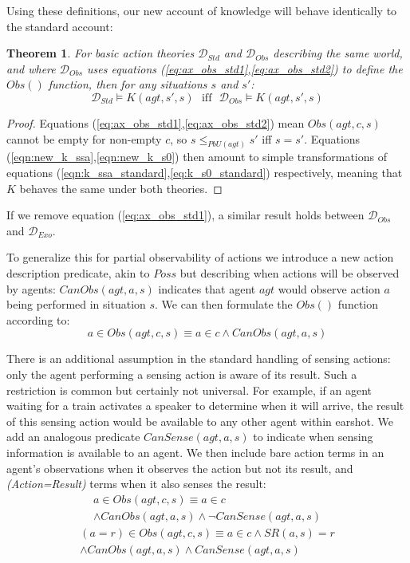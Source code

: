 \documentclass{ifaamas-submission}
\newtheorem{theorem}{Theorem}
\begin{document}
Using these definitions, our new account of knowledge will behave
identically to the standard account:

\begin{theorem}%
For basic action theories $\mathcal{D}_{Std}$ and $\mathcal{D}_{Obs}$
describing the same world, and where $\mathcal{D}_{Obs}$ uses equations
(\ref{eq:ax_obs_std1},\ref{eq:ax_obs_std2}) to define the $Obs()$
function, then for any situations $s$ and $s'$:\[
\mathcal{D}_{Std}\models K(agt,s',s)\,\,\,\,\mathrm{iff}\,\,\,\,\mathcal{D}_{Obs}\models K(agt,s',s)\]

\end{theorem}%
\begin{proof}%
Equations (\ref{eq:ax_obs_std1},\ref{eq:ax_obs_std2}) mean $Obs(agt,c,s)$
cannot be empty for non-empty $c$, so $s\leq_{PbU(agt)}s'$ iff $s=s'$.
Equations (\ref{eqn:new_k_ssa},\ref{eqn:new_k_s0}) then amount to
simple transformations of equations (\ref{eqn:k_ssa_standard},\ref{eq:k_s0_standard})
respectively, meaning that $K$ behaves the same under both theories.
\end{proof}%
If we remove equation (\ref{eq:ax_obs_std1}), a similar result holds
between $\mathcal{D}_{Obs}$ and $\mathcal{D}_{Exo}$.

To generalize this for partial observability of actions we introduce
a new action description predicate, akin to $Poss$ but describing
when actions will be observed by agents: $CanObs(agt,a,s)$ indicates
that agent $agt$ would observe action $a$ being performed in situation
$s$. We can then formulate the $Obs()$ function according
to:\[
a\in Obs(agt,c,s)\equiv a\in c\wedge CanObs(agt,a,s)\]


There is an additional assumption in the standard handling of sensing
actions: only the agent performing a sensing action is aware of its
result. Such a restriction is common but certainly not universal.
For example, if an agent waiting for a train activates a speaker to
determine when it will arrive, the result of this sensing action would
be available to any other agent within earshot. We add an analogous
predicate $CanSense(agt,a,s)$ to indicate when sensing information
is available to an agent. We then include bare action terms in an
agent's observations when it observes the action but not its result,
and \emph{(Action=Result)} terms when it also senses the result:\begin{multline*}
a\in Obs(agt,c,s)\equiv a\in c\\
\wedge CanObs(agt,a,s)\wedge\neg CanSense(agt,a,s)\end{multline*}
\begin{multline*}
(a=r)\in Obs(agt,c,s)\equiv a\in c\wedge SR(a,s)=r\\
\wedge CanObs(agt,a,s)\wedge CanSense(agt,a,s)\end{multline*}
\end{document}
